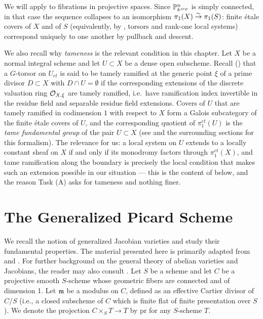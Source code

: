 \begin{bluemath}
We will apply  to fibrations
in projective spaces. Since $\mathbb{P}^n_{k^{sep}}$ is simply connected, in that
case the sequence collapses to an isomorphism $\pi_1(X) \overset{\sim}{\to} \pi_1(S)$:
finite \'etale covers of $X$ and of $S$ (equivalently, by
, torsors and rank-one local
systems) correspond uniquely to one another by pullback and descent.

We also recall why \emph{tameness} is the relevant condition in this
chapter. Let $X$ be a normal integral scheme and let $U \subset X$ be a
dense open subscheme. Recall
() that a $G$-torsor on
$U_{et}$ is said to be tamely ramified at the generic point $\xi$ of a prime
divisor $D \subset X$ with $D \cap U = \emptyset$ if the corresponding
extensions of the discrete valuation ring $\mathcal{O}_{X, \xi}$ are tamely
ramified, i.e.\ have ramification index invertible in the residue field and
separable residue field extensions. Covers of $U$ that are tamely ramified
in codimension $1$ with respect to $X$ form a Galois subcategory of the
finite \'etale covers of $U$, and the corresponding quotient of
$\pi_1^{et}(U)$ is the \emph{tame fundamental group} of the pair $U \subset
X$ (see  and the surrounding sections for this formalism).
The relevance for us: a local system on $U$ extends to a locally constant
sheaf on $X$ if and only if its monodromy factors through $\pi_1^{et}(X)$,
and tame ramification along the boundary is precisely the local condition
that makes such an extension possible in our situation --- this is the
content of  below, and the reason
Task (A) asks for tameness and nothing finer.
\end{bluemath}


\section{The Generalized Picard Scheme}\label{section:generalized_picard}
We recall the notion of generalized Jacobian varieties and study their fundamental properties. The material presented here is primarily adapted from \cite{Guignard2018} and \cite{takeuchi2019blow}. For further background on the general theory of abelian varieties and Jacobians, the reader may also consult \cite{milneAV}.
Let $S$ be a scheme and let $C$ be a projective smooth $S$-scheme whose geometric fibers are connected and of dimension 1. Let $\mathfrak{m}$ be a modulus on $C$, defined as an effective Cartier divisor of $C/S$
(i.e., a closed subscheme of $C$ which is finite flat of finite presentation over $S$).
We denote the projection $C \times_S T \to T$ by $\text{pr}$ for any $S$-scheme $T$.

